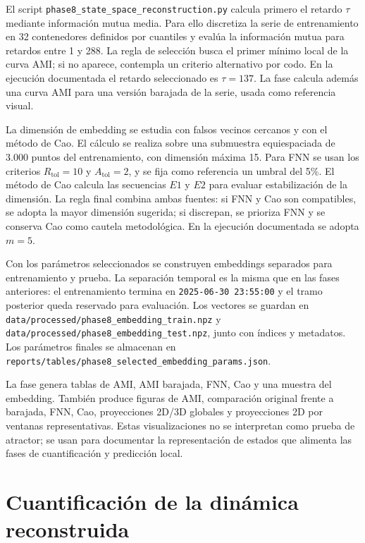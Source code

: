 El script \texttt{phase8\_\allowbreak state\_\allowbreak space\_\allowbreak reconstruction.py} calcula primero el retardo \(\tau\) mediante información mutua media. Para ello discretiza la serie de entrenamiento en 32 contenedores definidos por cuantiles y evalúa la información mutua para retardos entre 1 y 288. La regla de selección busca el primer mínimo local de la curva AMI; si no aparece, contempla un criterio alternativo por codo. En la ejecución documentada el retardo seleccionado es \(\tau=137\). La fase calcula además una curva AMI para una versión barajada de la serie, usada como referencia visual.

La dimensión de embedding se estudia con falsos vecinos cercanos y con el método de Cao. El cálculo se realiza sobre una submuestra equiespaciada de 3.000 puntos del entrenamiento, con dimensión máxima 15. Para FNN se usan los criterios \(R_{\text{tol}}=10\) y \(A_{\text{tol}}=2\), y se fija como referencia un umbral del 5\%. El método de Cao calcula las secuencias \(E1\) y \(E2\) para evaluar estabilización de la dimensión. La regla final combina ambas fuentes: si FNN y Cao son compatibles, se adopta la mayor dimensión sugerida; si discrepan, se prioriza FNN y se conserva Cao como cautela metodológica. En la ejecución documentada se adopta \(m=5\).

Con los parámetros seleccionados se construyen embeddings separados para entrenamiento y prueba. La separación temporal es la misma que en las fases anteriores: el entrenamiento termina en \texttt{2025-06-30 23:55:00} y el tramo posterior queda reservado para evaluación. Los vectores se guardan en \texttt{data/\allowbreak processed/\allowbreak phase8\_\allowbreak embedding\_\allowbreak train.npz} y \texttt{data/\allowbreak processed/\allowbreak phase8\_\allowbreak embedding\_\allowbreak test.npz}, junto con índices y metadatos. Los parámetros finales se almacenan en \texttt{reports/\allowbreak tables/\allowbreak phase8\_\allowbreak selected\_\allowbreak embedding\_\allowbreak params.json}.

La fase genera tablas de AMI, AMI barajada, FNN, Cao y una muestra del embedding. También produce figuras de AMI, comparación original frente a barajada, FNN, Cao, proyecciones 2D/3D globales y proyecciones 2D por ventanas representativas. Estas visualizaciones no se interpretan como prueba de atractor; se usan para documentar la representación de estados que alimenta las fases de cuantificación y predicción local.

\section{Cuantificación de la dinámica reconstruida}\label{sec:cuantificacion-dinamica}

